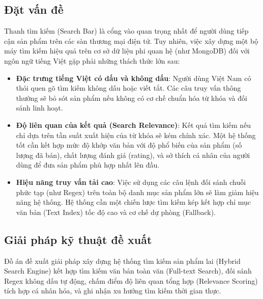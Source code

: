 \documentclass[../DoAn.tex]{subfiles}
\begin{document}
\subsection{Đặt vấn đề}
Thanh tìm kiếm (Search Bar) là cổng vào quan trọng nhất để người dùng tiếp cận sản phẩm trên các sàn thương mại điện tử. Tuy nhiên, việc xây dựng một bộ máy tìm kiếm hiệu quả trên cơ sở dữ liệu phi quan hệ (như MongoDB) đối với ngôn ngữ tiếng Việt gặp phải những thách thức lớn sau:
\begin{itemize}
    \item \textbf{Đặc trưng tiếng Việt có dấu và không dấu}: Người dùng Việt Nam có thói quen gõ tìm kiếm không dấu hoặc viết tắt. Các câu truy vấn thông thường sẽ bỏ sót sản phẩm nếu không có cơ chế chuẩn hóa từ khóa và đối sánh linh hoạt.
    \item \textbf{Độ liên quan của kết quả (Search Relevance)}: Kết quả tìm kiếm nếu chỉ dựa trên tần suất xuất hiện của từ khóa sẽ kém chính xác. Một hệ thống tốt cần kết hợp mức độ khớp văn bản với độ phổ biến của sản phẩm (số lượng đã bán), chất lượng đánh giá (rating), và sở thích cá nhân của người dùng để đưa sản phẩm phù hợp nhất lên đầu.
    \item \textbf{Hiệu năng truy vấn tải cao}: Việc sử dụng các câu lệnh đối sánh chuỗi phức tạp (như Regex) trên toàn bộ danh mục sản phẩm lớn sẽ làm giảm hiệu năng hệ thống. Hệ thống cần một chiến lược tìm kiếm kép kết hợp chỉ mục văn bản (Text Index) tốc độ cao và cơ chế dự phòng (Fallback).
\end{itemize}

\subsection{Giải pháp kỹ thuật đề xuất}
Đồ án đề xuất giải pháp xây dựng hệ thống tìm kiếm sản phẩm lai (Hybrid Search Engine) kết hợp tìm kiếm văn bản toàn văn (Full-text Search), đối sánh Regex không dấu tự động, chấm điểm độ liên quan tổng hợp (Relevance Scoring) tích hợp cá nhân hóa, và ghi nhận xu hướng tìm kiếm thời gian thực.
\end{document}
